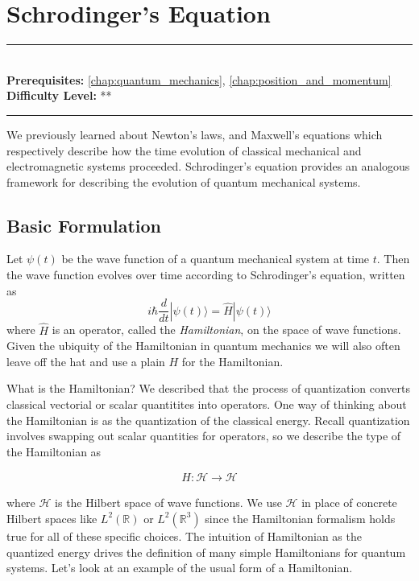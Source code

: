 \documentclass[book.tex]{subfiles}
\begin{document}
\chapter{Schrodinger's Equation}

\label{chap:schrodinger}
\noindent\rule{11cm}{0.4pt} \\
\textbf{Prerequisites:} \autoref{chap:quantum_mechanics}, \autoref{chap:position_and_momentum} \\
\textbf{Difficulty Level:} ** \\
\noindent\rule{11cm}{0.4pt}
\vspace{5mm}

We previously learned about Newton's laws, and Maxwell's equations which respectively describe how the time evolution of classical mechanical and electromagnetic systems proceeded. Schrodinger's equation provides an analogous framework for describing the evolution of quantum mechanical systems.

\section{Basic Formulation}

Let $\psi(t)$ be the wave function of a quantum mechanical system at time $t$. Then the wave function evolves over time according to Schrodinger's equation, written as 
\begin{equation}
i \hbar \frac{d}{dt}|\psi(t) \rangle = \hat{H}|\psi(t) \rangle
\end{equation}
where $\hat{H}$ is an operator, called the \textit{Hamiltonian}, on the space of wave functions. Given the ubiquity of the Hamiltonian in quantum mechanics we will also often leave off the hat and use a plain $H$ for the Hamiltonian.

What is the Hamiltonian? We described that the process of quantization converts classical vectorial or scalar quantitites into operators. One way of thinking about the Hamiltonian is as the quantization of the classical energy. Recall quantization involves swapping out scalar quantities for operators, so we describe the type of the Hamiltonian as

\begin{align}
H: \mathcal{H} \to \mathcal{H}
\end{align}

where $\mathcal{H}$ is the Hilbert space of wave functions. We use $\mathcal{H}$ in place of concrete Hilbert spaces like $L^2(\mathbb{R})$ or $L^2(\mathbb{R}^3)$ since the Hamiltonian formalism holds true for all of these specific choices. The intuition of Hamiltonian as the quantized energy drives the definition of many simple Hamiltonians for quantum systems. Let's look at an example of the usual form of a Hamiltonian.
\end{document}
